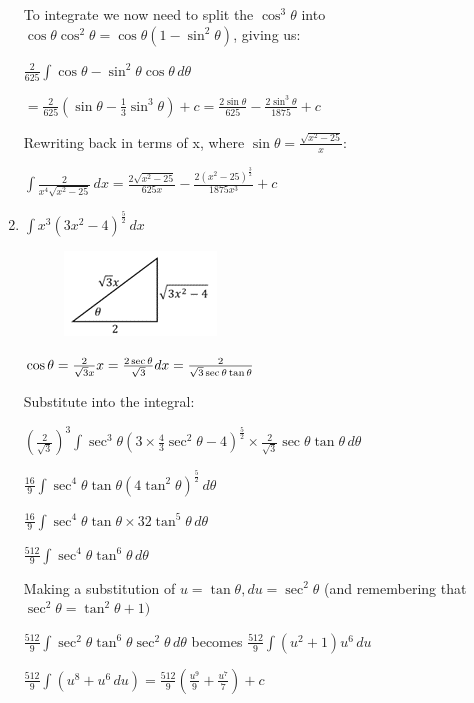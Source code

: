 \documentclass[../main.tex]{subfiles}
\begin{document}
\begin{enumerate}
    To integrate we now need to split the \(\cos^3{\theta}\) into \(\cos{\theta}\cos^2{\theta}=\cos{\theta}(1-\sin^2{\theta})\), giving us:

    \(\frac{2}{625}\int \cos{\theta}-\sin^2{\theta}\cos{\theta}\,d\theta\)

    \(=\frac{2}{625}(\sin{\theta}-\frac{1}{3}\sin^3{\theta})+c=\frac{2\sin{\theta}}{625}-\frac{2\sin^3{\theta}}{1875}+c\)

    Rewriting back in terms of x, where \(\sin{\theta}=\frac{\sqrt{x^2-25}}{x}\):

    \(\int \frac{2}{x^4\sqrt{x^2-25}}\,dx=\frac{2\sqrt{x^2-25}}{625x}-\frac{2(x^2-25)^\frac{3}{2}}{1875x^3}+c\)

    \item 
    \(\int x^3(3x^2-4)^{\frac{5}{2}}\,dx\)
    \begin{figure}[h]
        \includegraphics{images/trigsuba6.png}
    \end{figure}

    \(\cos{\theta}=\frac{2}{\sqrt{3}x}\\
    x=\frac{2\sec{\theta}}{\sqrt{3}}\\
    dx=\frac{2}{\sqrt{3}\sec{\theta}\tan{\theta}}\)

    Substitute into the integral:

    \((\frac{2}{\sqrt{3}})^3\int \sec^3{\theta}(3\times \frac{4}{3}\sec^2{\theta}-4)^{\frac{5}{2}}\times \frac{2}{\sqrt{3}}\sec{\theta}\tan{\theta}\,d\theta\)

    \(\frac{16}{9}\int \sec^4{\theta}\tan{\theta}(4\tan^2{\theta})^{\frac{5}{2}}\,d\theta\)

    \(\frac{16}{9}\int \sec^4{\theta}\tan{\theta}\times 32\tan^5{\theta}\,d\theta\)

    \(\frac{512}{9}\int \sec^4{\theta}\tan^6{\theta}\,d\theta\)

    Making a substitution of \(u=\tan{\theta}, du=\sec^2{\theta}\) (and remembering that \(\sec^2{\theta}=\tan^2{\theta}+1)\)

    \(\frac{512}{9}\int \sec^2{\theta}\tan^6{\theta}\sec^2{\theta}\,d\theta\) becomes \(\frac{512}{9}\int (u^2+1)u^6\,du\)

    \(\frac{512}{9}\int (u^8+u^6\,du)=\frac{512}{9}(\frac{u^9}{9}+\frac{u^7}{7})+c\)


\end{enumerate}
\end{document}
